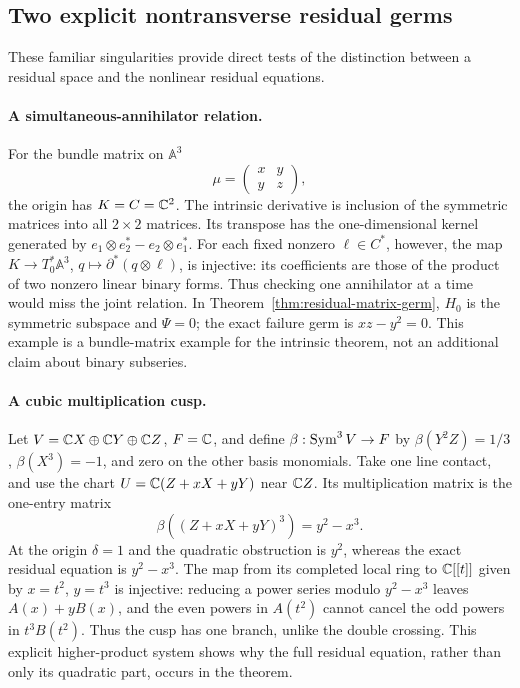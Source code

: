 \subsection{Two explicit nontransverse residual germs}
These familiar singularities provide direct tests of the distinction
between a residual space and the nonlinear residual equations.

\paragraph{A simultaneous-annihilator relation.}
For the bundle matrix on $\mathbb A^3$
\[
 \mu=\begin{pmatrix}x&y\\ y&z\end{pmatrix},
\]
the origin has $K=C=\mathbb C^2$. The intrinsic derivative is inclusion
of the symmetric matrices into all $2\times2$ matrices. Its transpose
has the one-dimensional kernel generated by
$e_1\otimes e_2^*-e_2\otimes e_1^*$. For each fixed nonzero
$\ell\in C^*$, however, the map
$K\to T_0^*\mathbb A^3$, $q\mapsto\partial^*(q\otimes\ell)$,
is injective: its coefficients are those of the product of two
nonzero linear binary forms. Thus checking one annihilator at a time
would miss the joint relation. In
Theorem~\ref{thm:residual-matrix-germ}, $H_0$ is the symmetric
subspace and $\Psi=0$; the exact failure germ is $xz-y^2=0$.
This example is a bundle-matrix example for the intrinsic theorem,
not an additional claim about binary subseries.

\paragraph{A cubic multiplication cusp.}\label{ex:cubic-residual-cusp}
Let $V=\mathbb C X\oplus\mathbb C Y\oplus\mathbb C Z$, $F=\mathbb C$, and define
$\beta:\operatorname{Sym}^3V\to F$ by
$\beta(Y^2Z)=1/3$, $\beta(X^3)=-1$, and zero on the other
basis monomials. Take one line contact, and use the chart
$U=\mathbb C(Z+xX+yY)$ near $\mathbb C Z$. Its multiplication matrix is the
one-entry matrix
\[
 \beta((Z+xX+yY)^3)=y^2-x^3.
\]
At the origin $\delta=1$ and the quadratic obstruction is $y^2$,
whereas the exact residual equation is $y^2-x^3$. The map from its
completed local ring to $\mathbb C[[t]]$ given by $x=t^2$, $y=t^3$
is injective: reducing a power series modulo $y^2-x^3$ leaves
$A(x)+yB(x)$, and the even powers in $A(t^2)$ cannot cancel the
odd powers in $t^3B(t^2)$. Thus the cusp has one branch, unlike the
double crossing. This explicit higher-product system shows why the
full residual equation, rather than only its quadratic part, occurs
in the theorem.

